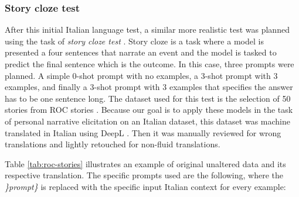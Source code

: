 \subsubsection{Story cloze test}
After this initial Italian language test, a similar more realistic test was planned using the task of \emph{story cloze test} \cite{mostafazadeh2016corpus}. Story cloze is a task where a model is presented a four sentences that narrate an event and the model is tasked to predict the final sentence which is the outcome. In this case, three prompts were planned. A simple 0-shot prompt with no examples, a 3-shot prompt with 3 examples, and finally a 3-shot prompt with 3 examples that specifies the answer has to be one sentence long. The dataset used for this test is the selection of 50 stories from ROC stories \cite{mostafazadeh2016corpus}. Because our goal is to apply these models in the task of personal narrative elicitation on an Italian dataset, this dataset was machine translated in Italian using DeepL \cite{deepl}. Then it was manually reviewed for wrong translations and lightly retouched for non-fluid translations. 

Table \ref{tab:roc-stories} illustrates an example of original unaltered data and its respective translation.
The specific prompts used are the following, where the \emph{\}prompt\}} is replaced with the specific input Italian context for every example:
